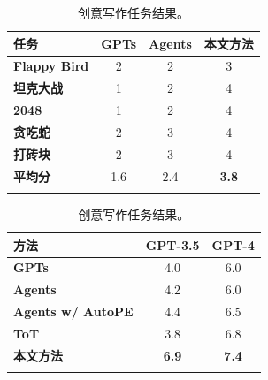 \begin{table}[htb]
  \centering
  \begin{minipage}[t]{.53\linewidth}
      \centering
      \caption{软件开发任务结果。}
      \label{tab:software}
      \small
      \renewcommand\tabcolsep{4pt}
      \begin{tabular}{l|ccc}
      \Xhline{1.5pt}
      \textbf{任务} & \textbf{GPTs} & \textbf{Agents} & \textbf{本文方法} \\
      \hline
      \bfseries Flappy Bird & 2 & 2 & 3 \\
      \bfseries 坦克大战 & 1 & 2 & 4 \\
      \bfseries 2048 & 1 & 2 & 4 \\
      \bfseries 贪吃蛇 & 2 & 3 & 4 \\
      \bfseries 打砖块 & 2 & 3 & 4 \\ \hline
      \bfseries 平均分 & 1.6 & 2.4 & \bfseries 3.8 \\
      \Xhline{1.5pt}
      \end{tabular}
  \end{minipage}%
  \hfill
  \begin{minipage}[t]{.43\linewidth}
      \centering
      \caption{创意写作任务结果。}
      \label{tab:writing}
      \small
      \renewcommand\tabcolsep{4pt}
      \begin{tabular}{l|cc}
      \Xhline{1.5pt}
      \textbf{方法} & \textbf{GPT-3.5} & \textbf{GPT-4} \\
      \hline
      \bfseries GPTs & 4.0 & 6.0 \\
      \bfseries Agents & 4.2 & 6.0 \\
      \bfseries Agents w/ AutoPE & 4.4 & 6.5 \\
      \bfseries ToT & 3.8 & 6.8 \\ \hline
      \bfseries 本文方法 & \bfseries 6.9 & \bfseries 7.4 \\
      \Xhline{1.5pt}
      \end{tabular}
  \end{minipage}
\end{table}

